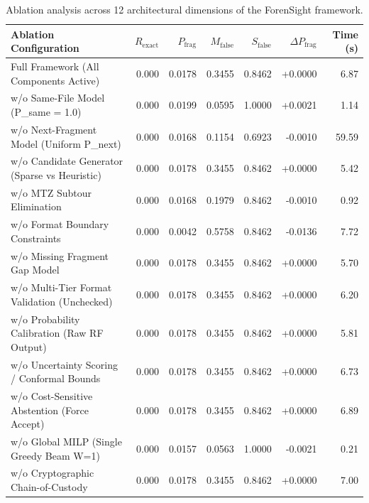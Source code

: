 \begin{table}[t]
\centering
\caption{Ablation analysis across 12 architectural dimensions of the ForenSight framework.}
\label{tab:component_ablations}
\begin{tabular}{lrrrrrr}
\toprule
\textbf{Ablation Configuration} & \textbf{$R_{\text{exact}}$} & \textbf{$P_{\text{frag}}$} & \textbf{$M_{\text{false}}$} & \textbf{$S_{\text{false}}$} & \textbf{$\Delta P_{\text{frag}}$} & \textbf{Time (s)} \\
\midrule
Full Framework (All Components Active) & 0.000 & 0.0178 & 0.3455 & 0.8462 & +0.0000 & 6.87 \\
w/o Same-File Model (P_same = 1.0) & 0.000 & 0.0199 & 0.0595 & 1.0000 & +0.0021 & 1.14 \\
w/o Next-Fragment Model (Uniform P_next) & 0.000 & 0.0168 & 0.1154 & 0.6923 & -0.0010 & 59.59 \\
w/o Candidate Generator (Sparse vs Heuristic) & 0.000 & 0.0178 & 0.3455 & 0.8462 & +0.0000 & 5.42 \\
w/o MTZ Subtour Elimination & 0.000 & 0.0168 & 0.1979 & 0.8462 & -0.0010 & 0.92 \\
w/o Format Boundary Constraints & 0.000 & 0.0042 & 0.5758 & 0.8462 & -0.0136 & 7.72 \\
w/o Missing Fragment Gap Model & 0.000 & 0.0178 & 0.3455 & 0.8462 & +0.0000 & 5.70 \\
w/o Multi-Tier Format Validation (Unchecked) & 0.000 & 0.0178 & 0.3455 & 0.8462 & +0.0000 & 6.20 \\
w/o Probability Calibration (Raw RF Output) & 0.000 & 0.0178 & 0.3455 & 0.8462 & +0.0000 & 5.81 \\
w/o Uncertainty Scoring / Conformal Bounds & 0.000 & 0.0178 & 0.3455 & 0.8462 & +0.0000 & 6.73 \\
w/o Cost-Sensitive Abstention (Force Accept) & 0.000 & 0.0178 & 0.3455 & 0.8462 & +0.0000 & 6.89 \\
w/o Global MILP (Single Greedy Beam W=1) & 0.000 & 0.0157 & 0.0563 & 1.0000 & -0.0021 & 0.21 \\
w/o Cryptographic Chain-of-Custody & 0.000 & 0.0178 & 0.3455 & 0.8462 & +0.0000 & 7.00 \\
\bottomrule
\end{tabular}
\end{table}
